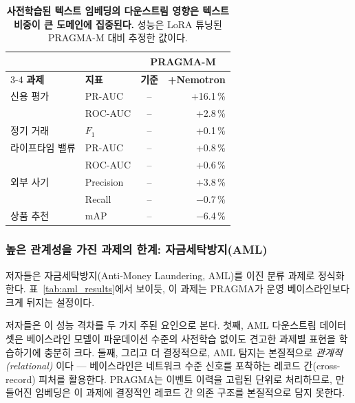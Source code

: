 \begin{table}[t]
\centering
\begin{tabular}{llcr}
& & \multicolumn{2}{c}{\textbf{PRAGMA-M}} \\
\cmidrule(lr){3-4}
\textbf{과제}            & \textbf{지표} & \textbf{기준} & \textbf{+Nemotron} \\
\midrule
신용 평가           & PR-AUC          & --                     & +16.1\,\%                   \\
                         & ROC-AUC         & --                     &  +2.8\,\%                   \\
\addlinespace
정기 거래   & $F_\text{1}$    & --                     &  +0.1\,\%                   \\
\addlinespace
라이프타임 밸류           & PR-AUC          & --                     &  +0.8\,\%                   \\
                         & ROC-AUC         & --                     &  +0.6\,\%                   \\
\addlinespace
외부 사기           & Precision       & --                     &  +3.8\,\%                   \\
                         & Recall          & --                     &  $-$0.7\,\%                   \\
\addlinespace
상품 추천   & mAP             & --                     &  $-$6.4\,\%                  \\
\end{tabular}
\caption{
    \textbf{사전학습된 텍스트 임베딩의 다운스트림 영향은 텍스트 비중이 큰 도메인에 집중된다.}
    성능은 LoRA 튜닝된 PRAGMA-M 대비 추정한 값이다.
}
\label{tab:pretrained_text_embedding}
\end{table}

\subsubsection{높은 관계성을 가진 과제의 한계: 자금세탁방지(AML)}
\label{sec:aml}
저자들은 자금세탁방지(Anti-Money Laundering, AML)를 이진 분류 과제로 정식화한다.
표~\ref{tab:aml_results}에서 보이듯, 이 과제는 PRAGMA가 운영 베이스라인보다 크게 뒤지는 설정이다.

저자들은 이 성능 격차를 두 가지 주된 요인으로 본다.
첫째, AML 다운스트림 데이터셋은 베이스라인 모델이 파운데이션 수준의 사전학습 없이도 견고한 과제별 표현을 학습하기에 충분히 크다.
둘째, 그리고 더 결정적으로, AML 탐지는 본질적으로 \emph{관계적(relational)} 이다 — 베이스라인은 네트워크 수준 신호를 포착하는 레코드 간(cross-record) 피처를 활용한다.
PRAGMA는 이벤트 이력을 고립된 단위로 처리하므로, 만들어진 임베딩은 이 과제에 결정적인 레코드 간 의존 구조를 본질적으로 담지 못한다.

